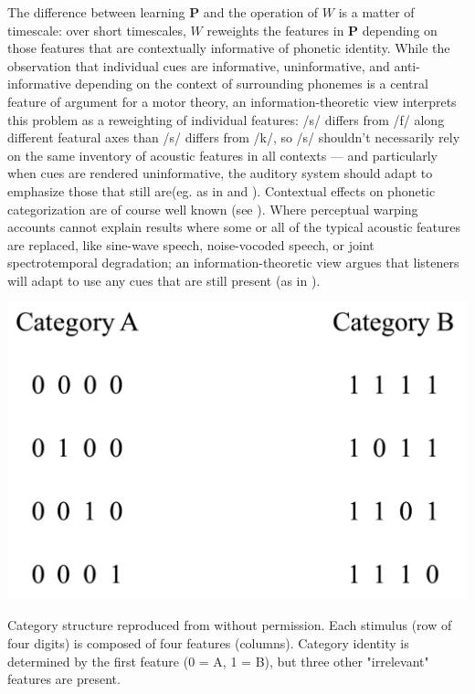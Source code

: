 The difference between learning $\mathbf{P}$ and the operation of $W$ is a matter of timescale: over short timescales, $W$ reweights the features in $\mathbf{P}$ depending on those features that are contextually informative of phonetic identity. While the observation that individual cues are informative, uninformative, and anti-informative depending on the context of surrounding phonemes is a central feature of argument for a motor theory\citep{Bailey1980}, an information-theoretic view interprets this problem as a reweighting of individual features: /s/ differs from /f/ along different featural axes than /s/ differs from /k/, so /s/ shouldn't necessarily rely on the same inventory of acoustic features in all contexts --- and particularly when cues are rendered uninformative, the auditory system should adapt to emphasize those that still are(eg. as in \citep{kiefteAbsorptionReliableSpectral2008} and \citep{kleinschmidtRobustSpeechPerception2015a}). Contextual effects on phonetic categorization are of course well known (see \citep{holtSpeechPerceptionCategorization2010}). Where perceptual warping accounts cannot explain results where some or all of the typical acoustic features are replaced, like sine-wave speech\citep{remezSpeechPerceptionTraditional1981}, noise-vocoded speech\citep{davisLexicalInformationDrives2005}, or joint spectrotemporal degradation\citep{elliottModulationTransferFunction2009a}; an information-theoretic view argues that listeners will adapt to use any cues that are still present (as in \citep{kiefteAbsorptionReliableSpectral2008}). 

\begin{marginfigure}[2.5cm]
\includegraphics[]{modeling/figures/rule_based_categorization.png}
\caption{Category structure reproduced from \citep{couchmanRulesResemblanceTheir2010} without permission. Each stimulus (row of four digits) is composed of four features (columns). Category identity is determined by the first feature (0 = A, 1 = B), but three other "irrelevant" features are present.}
\label{fig:rule_based}
\end{marginfigure}

